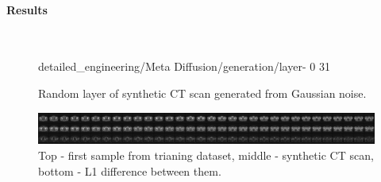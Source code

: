\paragraph{Results}\mbox{}\\

\begin{figure}[H]
    \centering
    {detailed_engineering/Meta Diffusion/generation/layer-}%
    {0}%
    {31}%
    \caption{Random layer of synthetic CT scan generated from Gaussian noise.}
    \label{fig:my_label}
\end{figure}

\begin{figure}[H]
    \centering
    \includegraphics[width=\linewidth]{detailed_engineering/Meta Diffusion/charts/meta_diffusion_comparison.png}
    \caption{Top - first sample from trianing dataset, middle - synthetic CT scan, bottom - L1 difference between them.}
    \label{fig:enter-label}
\end{figure}